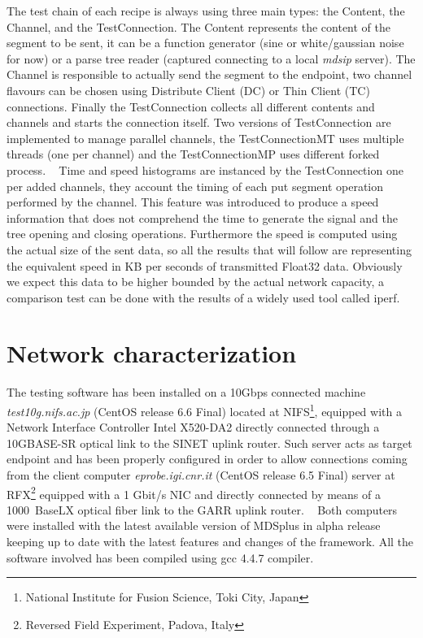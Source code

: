 \documentclass[10pt,a4paper]{article}
\begin{document}
The test chain of each recipe is always using three main types: the Content, the Channel, and the TestConnection. 
The Content represents the content of the segment to be sent, it can be a function generator (sine or white/gaussian noise for now) or a parse tree reader (captured connecting to a local \emph{mdsip} server). 
The Channel is responsible to actually send the segment to the endpoint, two channel flavours can be chosen using Distribute Client (DC) or Thin Client (TC) connections. Finally the TestConnection collects all different contents and channels and starts the connection itself. Two versions of TestConnection are implemented to manage parallel channels, the TestConnectionMT uses multiple threads (one per channel) and the TestConnectionMP uses different forked process.
~
Time and speed histograms are instanced by the TestConnection one per added channels, they account the timing of each put segment operation performed by the channel. This feature was introduced to produce a speed information that does not comprehend the time to generate the signal and the tree opening and closing operations. 
Furthermore the speed is computed using the actual size of the sent data, so all the results that will follow are representing the equivalent speed in KB per seconds of transmitted Float32 data. 
Obviously we expect this data to be higher bounded by the actual network capacity, a comparison test can be done with the results of a widely used tool called iperf.

\section{Network characterization}

The testing software has been installed on a 10Gbps connected machine \emph{test10g.nifs.ac.jp} (CentOS release 6.6 Final) located at NIFS\footnote{National Institute for Fusion Science, Toki City, Japan}, equipped with a Network Interface Controller Intel X520-DA2 directly connected through a 10GBASE-SR optical link to the SINET uplink router.
Such server acts as target endpoint and has been properly configured in order to allow connections coming from the client computer \emph{eprobe.igi.cnr.it} (CentOS release 6.5 Final) server at RFX\footnote{Reversed Field Experiment, Padova, Italy} equipped with a 1 Gbit/s NIC and directly connected by means of a 1000~BaseLX optical fiber link to the GARR uplink router.
~
Both computers were installed with the latest available version of MDSplus in alpha release keeping up to date with the latest features and changes of the framework.
All the software involved has been compiled using gcc 4.4.7 compiler.
\end{document}
